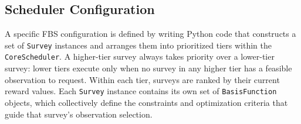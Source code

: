 \subsection{Scheduler Configuration}
\label{sec:configuration}

A specific FBS configuration is defined by writing Python code that constructs a
set of \texttt{Survey} instances and arranges them into prioritized tiers within
the \texttt{CoreScheduler}. A higher-tier survey always takes priority over a
lower-tier survey: lower tiers execute only when no survey in any higher tier
has a feasible observation to request. Within each tier, surveys are ranked by
their current reward values. Each \texttt{Survey} instance contains its own set
of \texttt{BasisFunction} objects, which collectively define the constraints
and optimization criteria that guide that survey's observation selection.


